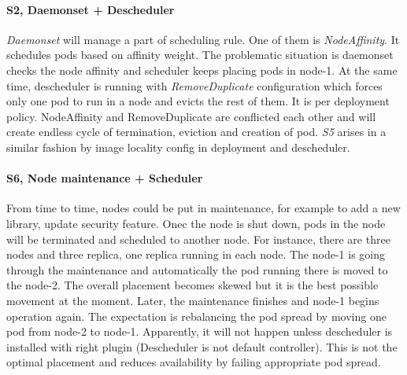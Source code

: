 \paragraph*{S2, Daemonset + Descheduler}
\textit{Daemonset} will manage a part of scheduling rule. One of them is \textit{NodeAffinity}. It schedules pods based on affinity weight. The problematic situation is daemonset checks the node affinity and scheduler keeps placing pods in node-1. At the same time, descheduler is running with \textit{RemoveDuplicate} configuration which forces only one pod to run in a node and evicts the rest of them. It is per deployment policy. NodeAffinity and RemoveDuplicate are conflicted each other and will create endless cycle of termination, eviction and creation of pod. 
\textit{S5} arises in a similar fashion by image locality config in deployment and descheduler.

\paragraph*{S6, Node maintenance + Scheduler}
From time to time, nodes could be put in maintenance, for example to add a new library, update security feature. Onec the node is shut down, pods in the node will be terminated and scheduled to another node. For instance, there are three nodes and three replica, one replica running in each node. The node-1 is going through the maintenance and automatically the pod running there is moved to the node-2. The overall placement becomes skewed but it is the best possible movement at the moment. Later, the maintenance finishes and node-1 begins operation again. The expectation is rebalancing the pod spread by moving one pod from node-2 to node-1. Apparently, it will not happen unless descheduler is installed with right plugin (Descheduler is not default controller). This is not the optimal placement and reduces availability by failing appropriate pod spread. 


